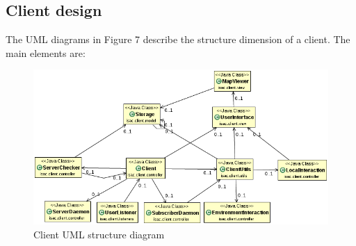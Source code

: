\documentclass[11pt]{article}
\begin{document}
\subsection{Client design}
The UML diagrams in Figure 7 describe the structure dimension of a client. The main elements are:
\begin{figure}
  \centering
	\includegraphics[scale=0.65]{clientUML}
  \caption{Client UML structure diagram}
\end{figure}
\end{document}
